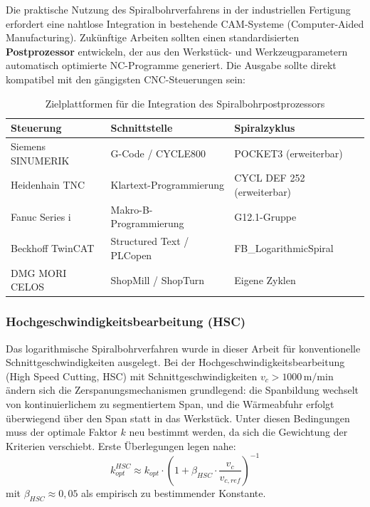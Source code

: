 ﻿\documentclass[12pt,a4paper]{article}
\begin{document}
Die praktische Nutzung des Spiralbohrverfahrens in der industriellen Fertigung erfordert eine nahtlose Integration in bestehende CAM-Systeme (Computer-Aided Manufacturing). Zukünftige Arbeiten sollten einen standardisierten \textbf{Postprozessor} entwickeln, der aus den Werkstück- und Werkzeugparametern automatisch optimierte NC-Programme generiert. Die Ausgabe sollte direkt kompatibel mit den gängigsten CNC-Steuerungen sein:

\begin{table}[H]
    \centering
    \begin{tabular}{|l|l|l|}
        \hline
        \textbf{Steuerung} & \textbf{Schnittstelle} & \textbf{Spiralzyklus} \\
        \hline
        Siemens SINUMERIK & G-Code / CYCLE800 & POCKET3 (erweiterbar) \\
        Heidenhain TNC & Klartext-Programmierung & CYCL DEF 252 (erweiterbar) \\
        Fanuc Series i & Makro-B-Programmierung & G12.1-Gruppe \\
        Beckhoff TwinCAT & Structured Text / PLCopen & FB\_LogarithmicSpiral \\
        DMG MORI CELOS & ShopMill / ShopTurn & Eigene Zyklen \\
        \hline
    \end{tabular}
    \caption{Zielplattformen für die Integration des Spiralbohrpostprozessors}
\end{table}

\subsubsection{Hochgeschwindigkeitsbearbeitung (HSC)}

Das logarithmische Spiralbohrverfahren wurde in dieser Arbeit für konventionelle Schnittgeschwindigkeiten ausgelegt. Bei der Hochgeschwindigkeitsbearbeitung (High Speed Cutting, HSC) mit Schnittgeschwindigkeiten $v_c > 1000\,\text{m/min}$ ändern sich die Zerspanungsmechanismen grundlegend: die Spanbildung wechselt von kontinuierlichem zu segmentiertem Span, und die Wärmeabfuhr erfolgt überwiegend über den Span statt in das Werkstück. Unter diesen Bedingungen muss der optimale Faktor $k$ neu bestimmt werden, da sich die Gewichtung der Kriterien verschiebt. Erste Überlegungen legen nahe:
\begin{equation}
    k_{opt}^{HSC} \approx k_{opt} \cdot \left(1 + \beta_{HSC} \cdot \frac{v_c}{v_{c,ref}}\right)^{-1}
\end{equation}
mit $\beta_{HSC} \approx 0{,}05$ als empirisch zu bestimmender Konstante.
\end{document}
